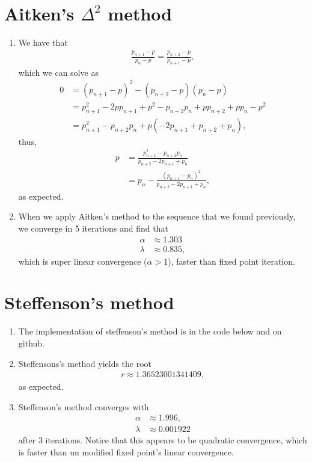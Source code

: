 \documentclass[10pt]{article}
\begin{document}
\section{Aitken's $\Delta^2$ method}
\begin{enumerate}
  \item We have that \begin{align*}
      \frac{p_{n+1} - p}{p_n - p} = \frac{p_{n+2} - p}{p_{n+1} - p},
  \end{align*} which we can solve as \begin{align*}
      0 &= (p_{n+1}-p)^2 - (p_{n+2} - p)(p_n-p) \\
      &= p_{n+1}^2 - 2pp_{n+1} + p^2 - p_{n+2}p_n + pp_{n+2} + pp_n - p^2 \\
      &= p_{n+1}^2 - p_{n+2}p_n + p(-2p_{n+1} + p_{n+2} + p_n),
  \end{align*} thus, \begin{align*}
    p &= \frac{p_{n+1}^2 - p_{n+2}p_n}{p_{n+2} - 2p_{n+1}+p_n} \\
    &= p_n - \frac{(p_{n+1}-p_n)^2}{p_{n+2} - 2p_{n+1}+p_n},
  \end{align*} as expected.

  \item When we apply Aitken's method to the sequence that we found previously, we converge in 5 iterations and find that \begin{align*}
    \alpha &\approx 1.303 \\
    \lambda &\approx 0.835,
  \end{align*} which is super linear convergence (\(\alpha > 1\)), faster than fixed point iteration.
\end{enumerate}

\section{Steffenson's method}
\begin{enumerate}
\item The implementation of steffenson's method is in the code below and on github.

\item Steffensons's method yields the root \begin{align*}
    r \approx 1.36523001341409,
\end{align*} as expected.

\item Steffenson's method converges with \begin{align*}
    \alpha &\approx 1.996, \\
    \lambda &\approx 0.001922
\end{align*} after 3 iterations. Notice that this appears to be quadratic convergence, which is faster than un modified fixed point's linear convergence.
\end{enumerate}

{\small }   
\end{document}
